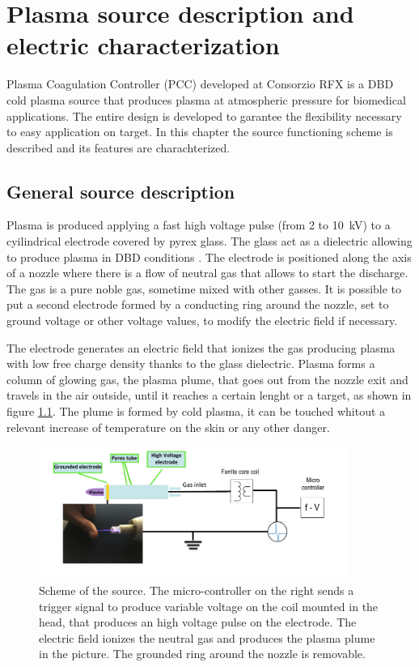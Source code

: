 \chapter{Plasma source description and electric characterization}
\label{ch:electric}
Plasma Coagulation Controller (PCC) developed at Consorzio RFX is a DBD cold plasma source that produces plasma at atmospheric pressure for biomedical applications. The entire design is developed to garantee the flexibility necessary to easy application on target. In this chapter the source functioning scheme is described and its features are charachterized.

\section{General source description}
Plasma is produced applying a fast high voltage pulse (from \num{2} to \SI{10}{\kilo\volt}) to a cyilindrical electrode covered by pyrex glass. The glass act as a dielectric allowing to produce plasma in DBD conditions \cite{DeMasi_2018}. The electrode is positioned along the axis of a nozzle where there is a flow of neutral gas that allows to start the discharge. The gas is a pure noble gas, sometime mixed with other gasses. It is possible to put a second electrode formed by a conducting ring around the nozzle, set to ground voltage or other voltage values, to modify the electric field if necessary.

The electrode generates an electric field that ionizes the gas producing plasma with low free charge density thanks to the glass dielectric. Plasma forms a column of glowing gas, the plasma plume, that goes out from the nozzle exit and travels in the air outside, until it reaches a certain lenght or a target, as shown in figure \ref{fig:source_scheme}. The plume is formed by cold plasma, it can be touched whitout a relevant increase of temperature on the skin or any other danger.
\begin{figure}
 \centering
 \includegraphics[width=0.9\textwidth]{Images/Electric/scheme.png}
 \caption{Scheme of the source. The micro-controller on the right sends a trigger signal to produce variable voltage on the coil mounted in the head, that produces an high voltage pulse on the electrode. The electric field ionizes the neutral gas and produces the plasma plume in the picture. The grounded ring around the nozzle is removable.}
 \label{fig:source_scheme}
\end{figure}

